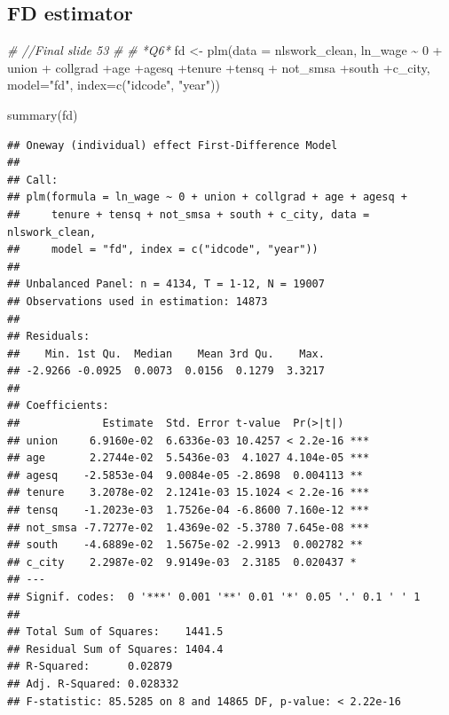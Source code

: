 \documentclass[
]{article}
\newenvironment{Shaded}{\begin{snugshade}}{\end{snugshade}}
\newcommand{\AttributeTok}[1]{\textcolor[rgb]{0.77,0.63,0.00}{#1}}
\newcommand{\CommentTok}[1]{\textcolor[rgb]{0.56,0.35,0.01}{\textit{#1}}}
\newcommand{\DecValTok}[1]{\textcolor[rgb]{0.00,0.00,0.81}{#1}}
\newcommand{\FunctionTok}[1]{\textcolor[rgb]{0.00,0.00,0.00}{#1}}
\newcommand{\NormalTok}[1]{#1}
\newcommand{\OtherTok}[1]{\textcolor[rgb]{0.56,0.35,0.01}{#1}}
\newcommand{\SpecialCharTok}[1]{\textcolor[rgb]{0.00,0.00,0.00}{#1}}
\newcommand{\StringTok}[1]{\textcolor[rgb]{0.31,0.60,0.02}{#1}}
\begin{document}
\hypertarget{fd-estimator}{%
\subsection{FD estimator}\label{fd-estimator}}

\begin{Shaded}
\begin{Highlighting}[]
\CommentTok{\# //Final slide 53}
\CommentTok{\# }
\CommentTok{\# *Q6*}
\NormalTok{  fd }\OtherTok{\textless{}{-}} \FunctionTok{plm}\NormalTok{(}\AttributeTok{data =}\NormalTok{ nlswork\_clean, ln\_wage }\SpecialCharTok{\textasciitilde{}} \DecValTok{0} \SpecialCharTok{+}\NormalTok{ union }\SpecialCharTok{+}
\NormalTok{              collgrad }\SpecialCharTok{+}\NormalTok{age }\SpecialCharTok{+}\NormalTok{agesq }\SpecialCharTok{+}\NormalTok{tenure }\SpecialCharTok{+}\NormalTok{tensq }\SpecialCharTok{+}
\NormalTok{              not\_smsa }\SpecialCharTok{+}\NormalTok{south }\SpecialCharTok{+}\NormalTok{c\_city, }\AttributeTok{model=}\StringTok{"fd"}\NormalTok{,}
            \AttributeTok{index=}\FunctionTok{c}\NormalTok{(}\StringTok{"idcode"}\NormalTok{, }\StringTok{"year"}\NormalTok{))}
    
    \FunctionTok{summary}\NormalTok{(fd)}
\end{Highlighting}
\end{Shaded}

\begin{verbatim}
## Oneway (individual) effect First-Difference Model
## 
## Call:
## plm(formula = ln_wage ~ 0 + union + collgrad + age + agesq + 
##     tenure + tensq + not_smsa + south + c_city, data = nlswork_clean, 
##     model = "fd", index = c("idcode", "year"))
## 
## Unbalanced Panel: n = 4134, T = 1-12, N = 19007
## Observations used in estimation: 14873
## 
## Residuals:
##    Min. 1st Qu.  Median    Mean 3rd Qu.    Max. 
## -2.9266 -0.0925  0.0073  0.0156  0.1279  3.3217 
## 
## Coefficients:
##             Estimate  Std. Error t-value  Pr(>|t|)    
## union     6.9160e-02  6.6336e-03 10.4257 < 2.2e-16 ***
## age       2.2744e-02  5.5436e-03  4.1027 4.104e-05 ***
## agesq    -2.5853e-04  9.0084e-05 -2.8698  0.004113 ** 
## tenure    3.2078e-02  2.1241e-03 15.1024 < 2.2e-16 ***
## tensq    -1.2023e-03  1.7526e-04 -6.8600 7.160e-12 ***
## not_smsa -7.7277e-02  1.4369e-02 -5.3780 7.645e-08 ***
## south    -4.6889e-02  1.5675e-02 -2.9913  0.002782 ** 
## c_city    2.2987e-02  9.9149e-03  2.3185  0.020437 *  
## ---
## Signif. codes:  0 '***' 0.001 '**' 0.01 '*' 0.05 '.' 0.1 ' ' 1
## 
## Total Sum of Squares:    1441.5
## Residual Sum of Squares: 1404.4
## R-Squared:      0.02879
## Adj. R-Squared: 0.028332
## F-statistic: 85.5285 on 8 and 14865 DF, p-value: < 2.22e-16
\end{verbatim}
\end{document}
